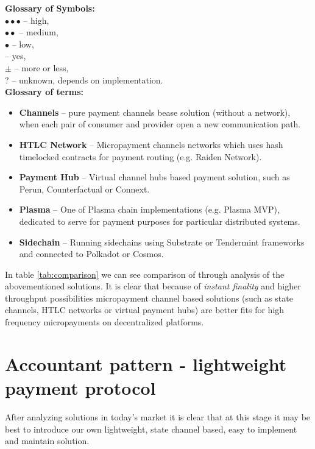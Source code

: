 \documentclass[a4paper,12pt]{article}
\begin{document}
\textbf{\large Glossary of Symbols:} \\
    $\bullet\bullet\bullet$ -- high, \\
    $\bullet\bullet$ -- medium, \\
    $\bullet$ -- low, \\
    \checkmark -- yes, \\
    $\pm$ -- more or less, \\
    $?$ -- unknown, depends on implementation. \\

\textbf{\large Glossary of terms:}
\begin{itemize}
    \item \textbf{Channels} -- pure payment channels bease solution (without 
    a network), when each pair of consumer and provider open a new communication
    path.
    \item \textbf{HTLC Network} -- Micropayment channels networks which uses hash
    timelocked contracts for payment routing (e.g. Raiden Network).
    \item \textbf{Payment Hub} -- Virtual channel hubs based payment solution, 
    such as Perun, Counterfactual or Connext.
    \item \textbf{Plasma} -- One of Plasma chain implementations (e.g. Plasma 
    MVP), dedicated to serve for payment purposes for particular distributed
    systems.
    \item \textbf{Sidechain} -- Running sidechains using Substrate or Tendermint
    frameworks and connected to Polkadot or Cosmos.
\end{itemize}

In table \ref{tab:comparison} we can see comparison of through analysis of the 
abovementioned solutions. It is clear that because of \textit{instant finality} 
and higher throughput possibilities micropayment channel based solutions (such as 
state channels, HTLC networks or virtual payment hubs) are better fits for high 
frequency micropayments on decentralized platforms.

\section{Accountant pattern - lightweight payment protocol}

After analyzing solutions in today’s market it is clear that at this stage it may 
be best to introduce our own lightweight, state channel based, easy to implement 
and maintain solution.
\end{document}
